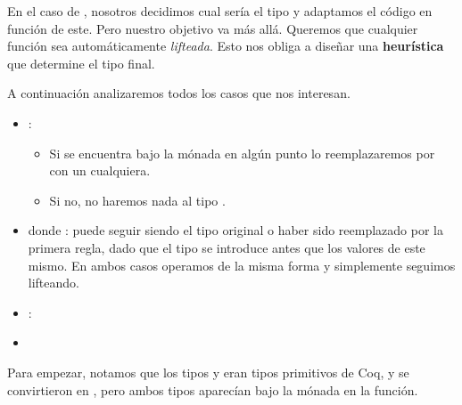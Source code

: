 En el caso de , nosotros decidimos cual sería el tipo y adaptamos el
código en función de este. Pero nuestro objetivo va más allá. Queremos que
cualquier función sea automáticamente \textit{lifteada}. Esto nos obliga a
diseñar una \textbf{heurística} que determine el tipo final.

A continuación analizaremos todos los casos que nos interesan.
\begin{itemize}
\item {}:
  \begin{itemize}
    \item Si  se encuentra bajo la mónada en algún punto lo
      reemplazaremos por  con  un 
      cualquiera.
    \item Si no, no haremos nada al tipo .
  \end{itemize}
\item {} donde :  puede seguir siendo el
  tipo original o haber sido reemplazado por la primera regla, dado que el tipo
  se introduce antes que los valores de este mismo. En ambos casos operamos de
  la misma forma y simplemente seguimos lifteando.
\item {}:

\item 
\end{itemize}

Para empezar, notamos que los tipos  y  eran tipos primitivos de
Coq, y se convirtieron en , pero ambos tipos aparecían bajo la
mónada en la función.